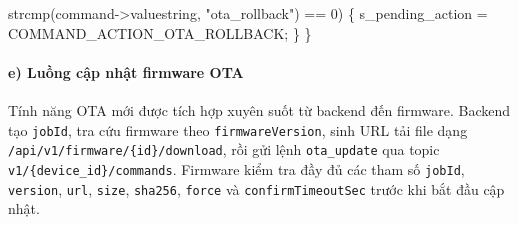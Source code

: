 \documentclass[13pt,a4paper]{extarticle}
\newenvironment{Shaded}{}{}
\newcommand{\DecValTok}[1]{\textcolor[rgb]{0.25,0.63,0.44}{#1}}
\newcommand{\NormalTok}[1]{#1}
\newcommand{\OperatorTok}[1]{\textcolor[rgb]{0.40,0.40,0.40}{#1}}
\newcommand{\StringTok}[1]{\textcolor[rgb]{0.25,0.44,0.63}{#1}}
\renewcommand{\\}{\thesislongtableorignewline\hline}%
\begin{document}
\begin{Shaded}
\begin{Highlighting}[]
\NormalTok{               strcmp}\OperatorTok{(}\NormalTok{command}\OperatorTok{{-}\textgreater{}}\NormalTok{valuestring}\OperatorTok{,} \StringTok{"ota\_rollback"}\OperatorTok{)} \OperatorTok{==} \DecValTok{0}\OperatorTok{)} \OperatorTok{\{}
\NormalTok{        s\_pending\_action }\OperatorTok{=}\NormalTok{ COMMAND\_ACTION\_OTA\_ROLLBACK}\OperatorTok{;}
    \OperatorTok{\}}
\OperatorTok{\}}
\end{Highlighting}
\end{Shaded}

\paragraph{e) Luồng cập nhật firmware
OTA}\label{e-luux1ed3ng-cux1eadp-nhux1eadt-firmware-ota}

Tính năng OTA mới được tích hợp xuyên suốt từ backend đến firmware.
Backend tạo \texttt{jobId}, tra cứu firmware theo
\texttt{firmwareVersion}, sinh URL tải file dạng
\texttt{/api/v1/firmware/\{id\}/download}, rồi gửi lệnh
\texttt{ota\_update} qua topic \texttt{v1/\{device\_id\}/commands}.
Firmware kiểm tra đầy đủ các tham số \texttt{jobId}, \texttt{version},
\texttt{url}, \texttt{size}, \texttt{sha256}, \texttt{force} và
\texttt{confirmTimeoutSec} trước khi bắt đầu cập nhật.
\end{document}
